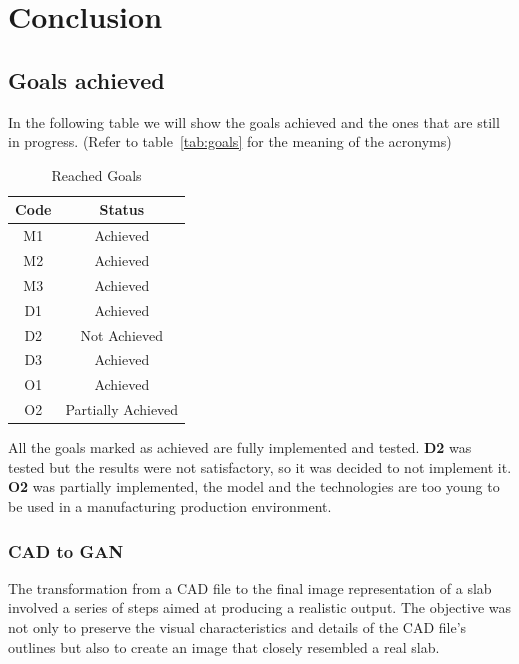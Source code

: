 \chapter{Conclusion}\label{cap:conclusions}
\section{Goals achieved}
In the following table we will show the goals achieved and the ones that are still in progress. (Refer to table~\ref{tab:goals} for the meaning of the acronyms)
\begin{table}[H]
    \caption{Reached Goals}\label{tab:reach-goals}
    \centering
    \begin{tabular}{|c|c|}
        \hline
        \textbf{Code} & \textbf{Status}\\
        \hline
        M1 & Achieved\\
        \hline
        M2 & Achieved\\
        \hline
        M3 & Achieved\\
        \hline
        D1 & Achieved\\
        \hline
        D2 & Not Achieved\\
        \hline
        D3 & Achieved\\
        \hline
        O1 & Achieved\\
        \hline
        O2 & Partially Achieved\\
        \hline
    \end{tabular}
\end{table}
All the goals marked as achieved are fully implemented and tested.
\textbf{D2} was tested but the results were not satisfactory, so it was decided to not implement it.
\textbf{O2} was partially implemented, the model and the technologies are too young to be used in a manufacturing production environment.
\subsection{CAD to GAN}\label{subsec:user-interface}
The transformation from a CAD file to the final image representation of a slab involved a series of steps aimed at producing a realistic output. 
The objective was not only to preserve the visual characteristics and details of the CAD file's outlines but also to create an image that closely resembled a real slab.

